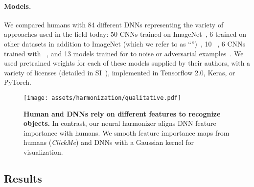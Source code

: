 \paragraph{Models.}
We compared humans with 84 different DNNs representing the variety of approaches used in the field today: 50 CNNs trained on ImageNet~\cite{Chen2021-is,Tan2019-uh,Radosavovic2020-cs,Howard2019-cr,Simonyan2014-jd,Huang2018-yt,He2015-lm,Zhang2020-my,Gao2021-er,Kolesnikov2019-gg,Sandler2018-lh,Liu2022-es,Szegedy2016-fd,Szegedy2015-pr,Chollet2016-np,Radford2021-km,Xie2019-ju,Xie2016-ol,Szegedy2015-pr,Brendel2019-mw,Mehta2020-ad,Chen2017-wp,Wang2019-jm,Tan2018-zk}, 6 {\color{CNN}{CNNs}} trained on other datasets in addition to ImageNet (which we refer to as ``{\color{CNN_data}{CNN extra data}}'')~\cite{Xie2019-rp,Radford2021-km,Liu2022-es}, 10 {\color{transformer}{vision transformers}}~\cite{DAscoli2021-xw,Touvron2020-fo,Tolstikhin2021-hw,Dosovitskiy2020-if,Steiner2021-pl}, 6 CNNs trained with {\color{selfsup}{self-supervision}}~\cite{Chen2020-lw,Zeki_Yalniz2019-yo}, and 13 models trained for {\color{robust}{robustness}} to noise or adversarial examples~\cite{Geirhos2018-ag,Salman2020-lo}. We used pretrained weights for each of these models supplied by their authors, with a variety of licenses (detailed in SI~), implemented in Tensorflow 2.0, Keras, or PyTorch.

\begin{figure}[!t]
  \centering
    \texttt{[image: assets/harmonization/qualitative.pdf]}
  \caption{\textbf{Human and DNNs rely on different features to recognize objects.} In contrast, our neural harmonizer aligns DNN feature importance with humans. We smooth feature importance maps from humans (\textit{ClickMe}) and DNNs with a Gaussian kernel for visualization.}
\label{fig:harmonization:clickme_qualitative}
\end{figure}

\subsection{Results}\label{sec:meta_pred}
